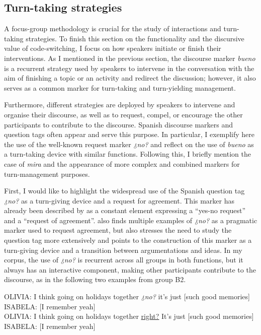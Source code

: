 \documentclass[output=paper]{langscibook}
\begin{document}
\subsection{Turn-taking strategies}\label{RG:sec:05_3}

A focus-group methodology is crucial for the study of interactions and turn-taking strategies. To finish this section on the functionality and the discursive value of code-switching, I focus on how speakers initiate or finish their interventions. As I mentioned in the previous section, the discourse marker \textit{bueno} is a recurrent strategy used by speakers to intervene in the conversation with the aim of finishing a topic or an activity and redirect the discussion; however, it also serves as a common marker for turn-taking and turn-yielding management. 

Furthermore, different strategies are deployed by speakers to intervene and organise their discourse, as well as to request, compel, or encourage the other participants to contribute to the discourse. Spanish discourse markers and question tags often appear and serve this purpose. In particular, I exemplify here the use of the well-known request marker \textit{¿no?} and reflect on the use of \textit{bueno} as a turn-taking device with similar functions. Following this, I briefly mention the case of \textit{mira} and the appearance of more complex and combined markers for turn-management purposes.

First, I would like to highlight the widespread use of the Spanish question tag \textit{¿no?} as a turn-giving device and a request for agreement. This marker has already been described by \citet[493]{moyer_negotiating_2000} as a constant element expressing a “yes-no request” and a “request of agreement”. \citet[445]{goria_functional_2017} also finds multiple examples of \textit{¿no?} as a pragmatic marker used to request agreement, but also stresses the need to study the question tag more extensively and points to the construction of this marker as a turn-giving device and a transition between argumentations and ideas. In my corpus, the use of \textit{¿no?} is recurrent across all groups in both functions, but it always has an interactive component, making other participants contribute to the discourse, as in the following two examples from group B2.

\begin{exe}\ex\label{RG:ex16}
OLIVIA: I think going on holidays together \textit{¿no?} it’s just [such good memories]\\
ISABELA: [I remember yeah]\\

OLIVIA: I think going on holidays together \ul{right?} It’s just [such good memories]\\
ISABELA: [I remember yeah]
\end{exe}
\end{document}
